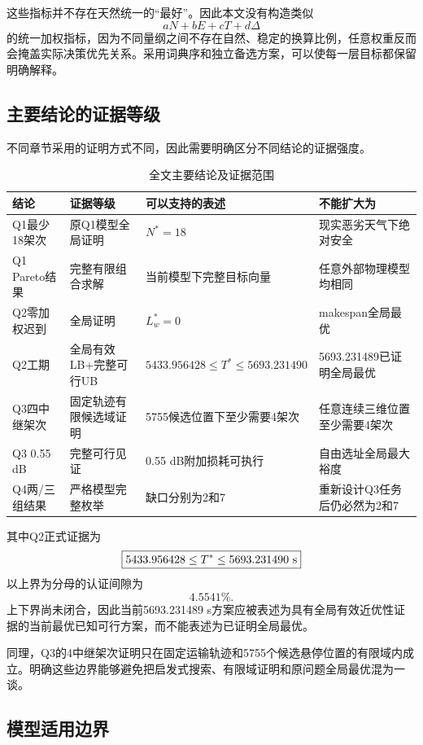 \documentclass[UTF8,a4paper,12pt]{ctexart}
\begin{document}
这些指标并不存在天然统一的“最好”。因此本文没有构造类似
\[
aN+bE+cT+d\Delta
\]
的统一加权指标，因为不同量纲之间不存在自然、稳定的换算比例，任意权重反而会掩盖实际决策优先关系。采用词典序和独立备选方案，可以使每一层目标都保留明确解释。

\subsection{主要结论的证据等级}

不同章节采用的证明方式不同，因此需要明确区分不同结论的证据强度。

\begin{table}[H]
\centering
\caption{全文主要结论及证据范围}
\begin{tabular}{p{3.0cm}p{3.2cm}p{4.2cm}p{4.2cm}}
\toprule
结论 & 证据等级 & 可以支持的表述 & 不能扩大为\\
\midrule
Q1最少18架次 & 原Q1模型全局证明 & $N^*=18$ & 现实恶劣天气下绝对安全\\
Q1 Pareto结果 & 完整有限组合求解 & 当前模型下完整目标向量 & 任意外部物理模型均相同\\
Q2零加权迟到 & 全局证明 & $L_w^*=0$ & makespan全局最优\\
Q2工期 & 全局有效LB+完整可行UB & $5433.956428\le T^*\le5693.231490$ & 5693.231489已证明全局最优\\
Q3四中继架次 & 固定轨迹有限候选域证明 & 5755候选位置下至少需要4架次 & 任意连续三维位置至少需要4架次\\
Q3 0.55 dB & 完整可行见证 & 0.55 dB附加损耗可执行 & 自由选址全局最大裕度\\
Q4两/三组结果 & 严格模型完整枚举 & 缺口分别为2和7 & 重新设计Q3任务后仍必然为2和7\\
\bottomrule
\end{tabular}
\end{table}

其中Q2正式证据为
\[
\boxed{
5433.956428
\le
T^*
\le
5693.231490\ {\rm s}
}
\]
以上界为分母的认证间隙为
\[
\boxed{4.5541\%}.
\]
上下界尚未闭合，因此当前5693.231489 s方案应被表述为具有全局有效近优性证据的当前最优已知可行方案，而不能表述为已证明全局最优。

同理，Q3的4中继架次证明只在固定运输轨迹和5755个候选悬停位置的有限域内成立。明确这些边界能够避免把启发式搜索、有限域证明和原问题全局最优混为一谈。

\subsection{模型适用边界}
\end{document}
